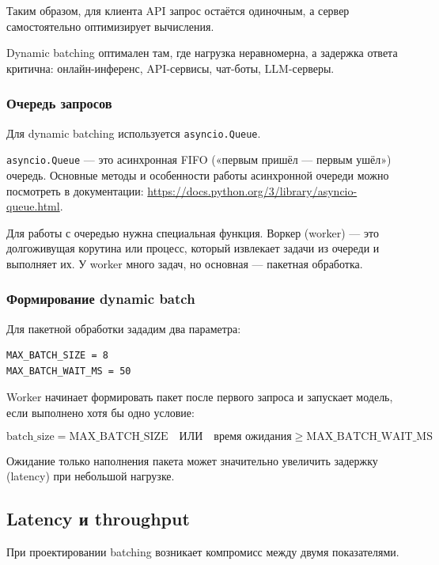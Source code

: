 \documentclass[12pt,a4paper]{article}
\begin{document}
Таким образом, для клиента API запрос остаётся одиночным, а сервер самостоятельно оптимизирует вычисления.

Dynamic batching оптимален там, где нагрузка неравномерна, а задержка ответа критична: онлайн-инференс, API-сервисы, чат-боты, LLM-серверы.

\subsubsection{Очередь запросов}

Для dynamic batching используется \texttt{asyncio.Queue}.

\texttt{asyncio.Queue} — это асинхронная FIFO («первым пришёл — первым ушёл») очередь. Основные методы и особенности работы асинхронной очереди можно посмотреть в документации: \url{https://docs.python.org/3/library/asyncio-queue.html}.

Для работы с очередью нужна специальная функция. Воркер (worker) — это долгоживущая корутина или процесс, который извлекает задачи из очереди и выполняет их. У worker много задач, но основная — пакетная обработка.

\subsubsection{Формирование dynamic batch}

Для пакетной обработки зададим два параметра:

\begin{lstlisting}[caption={Параметры batch}]
MAX_BATCH_SIZE = 8
MAX_BATCH_WAIT_MS = 50
\end{lstlisting}

Worker начинает формировать пакет после первого запроса и запускает модель, если выполнено хотя бы одно условие:

\begin{equation}
\text{batch\_size} = \text{MAX\_BATCH\_SIZE}
\quad \text{ИЛИ} \quad
\text{время ожидания} \ge \text{MAX\_BATCH\_WAIT\_MS}
\end{equation}

Ожидание только наполнения пакета может значительно увеличить задержку (latency) при небольшой нагрузке.

\subsection{Latency и throughput}

При проектировании batching возникает компромисс между двумя показателями.
\end{document}
